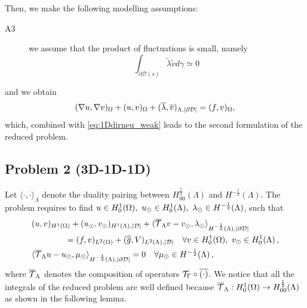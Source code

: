 \documentclass[r]{siamart171218}
\begin{document}
Then, we make the following modelling assumptions:
\begin{description}
\item[A3] we assume that the product of fluctuations is small, namely
\begin{equation*}
\int_{\partial\mathcal{D}(s)} \tilde{\lambda}\tilde{v} d\gamma \simeq 0\,
\end{equation*}
\end{description}
and we obtain 
\begin{equation*}
(\nabla u ,\nabla v)_{\Omega} +(u,v)_{\Omega}+(\overline{\lambda}, \overline{v})_{\Lambda , |\partial\mathcal{D}|}  =(f,v)_{\Omega},
\end{equation*}
which, combined with \eqref{eq:1Ddirneu_weak} leads to the second formulation of the reduced problem.

\subsection{Problem 2 (3D-1D-1D)}
Let $\langle \cdot , \cdot \rangle_\Lambda$ denote the duality pairing between 
$H^\frac12_{00}(\Lambda)$ and $H^{-\frac12}(\Lambda)$.
The problem requires to find $u \in H^1_0(\Omega),\ u_{\odot} \in H^1_0(\Lambda), \ \lambda_{\odot} \in H^{-\frac12}(\Lambda)$, such that
\begin{subequations}\label{eq:problem2}
\begin{align}
&(u,v)_{H^1(\Omega)} + (u_{\odot},v_{\odot})_{H^1(\Lambda),|\mathcal{D}|} 
+  \langle {\overline{\mathcal{T}}_\Lambda} v - v_{\odot}, \lambda_{\odot} \rangle_{H^{-\frac12}(\Lambda), |\partial\mathcal{D}|} 
\\
\nonumber
&\qquad\qquad= (f,v)_{L^2(\Omega)} +  (\overline{\overline{g}},V)_{L^2(\Lambda),|\mathcal{D}|}
\quad \forall v \in H^1_0(\Omega), \ v_{\odot} \in H^1_0(\Lambda)\,,
\\
&   \langle {\overline{\mathcal{T}}_\Lambda} u -   u_{\odot}, \mu_{\odot} \rangle_{H^{-\frac12}(\Lambda),|\partial\mathcal{D}|} = 0
\quad \forall \mu_{\odot} \in H^{-\frac12}(\Lambda)\,,
\end{align}
\end{subequations}
where ${\overline{\mathcal{T}}_\Lambda}$ denotes the composition of operators ${\mathcal{T}_\Gamma} \circ \overline{(\cdot)}$.
We notice that all the integrals of the reduced problem are well defined because 
${\overline{\mathcal{T}}_\Lambda}: H^1_0(\Omega) \rightarrow H^\frac12_{00}(\Lambda)$ as shown in the following lemma.
\end{document}
